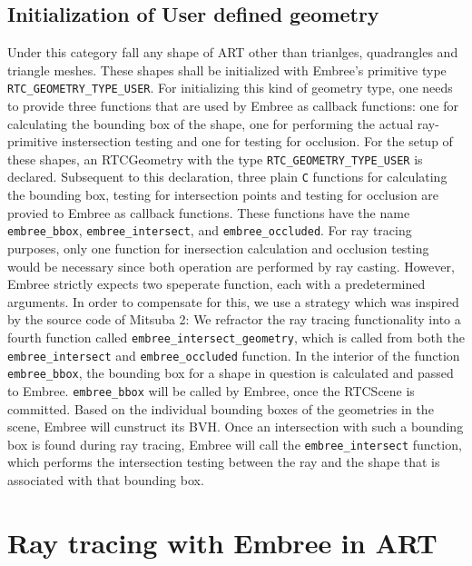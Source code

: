 \subsection{Initialization of User defined geometry}
\label{sec:init_user}
Under this category fall any shape of ART other than trianlges, quadrangles and triangle meshes. These shapes shall be initialized with Embree's primitive type \texttt{RTC\_GEOMETRY\_TYPE\_USER}. For initializing this kind of geometry type, one needs to provide three functions that are used by Embree as callback functions: one for calculating the bounding box of the shape, one for performing the actual ray-primitive instersection testing and one for testing for occlusion. For the setup of these shapes, an RTCGeometry with the type \texttt{RTC\_GEOMETRY\_TYPE\_USER} is declared. Subsequent to this declaration, three plain \texttt{C} functions for calculating the bounding box, testing for intersection points and testing for occlusion are provied to Embree as callback functions.
These functions have the name \texttt{embree\_bbox}, \texttt{embree\_intersect}, and \texttt{embree\_occluded}. For ray tracing purposes, only one function for inersection calculation and occlusion testing would be necessary since both operation are performed by ray casting. However, Embree strictly expects two speperate function, each with a predetermined arguments. In order to compensate for this, we use a strategy which was inspired by the source code of Mitsuba 2: We refractor the ray tracing functionality into a fourth function called \texttt{embree\_intersect\_geometry}, which is called from both the \texttt{embree\_intersect} and \texttt{embree\_occluded} function. 
In the interior of the function \texttt{embree\_bbox}, the bounding box for a shape in question is calculated and passed to Embree. \texttt{embree\_bbox} will be called by Embree, once the RTCScene is committed. Based on the individual bounding boxes of the geometries in the scene, Embree will cunstruct its BVH. Once an intersection with such a bounding box is found during ray tracing, Embree will call the \texttt{embree\_intersect} function, which performs the intersection testing between the ray and the shape that is associated with that bounding box.



\section{Ray tracing with Embree in ART}
\label{sec:embree_raycasting}

